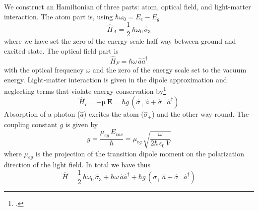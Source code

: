 We construct an Hamiltonian of three parts:  atom, optical field, and light-matter interaction. The atom part is, using $\hbar \omega_0 = E_e - E_g$ 
\begin{equation}
\hat{H}_A = \frac{1}{2} \, \hbar \omega_0 \, \hat{\sigma}_3
\end{equation}
where we have set the zero of the energy scale half way between ground and excited state. The optical field part is
\begin{equation}
\hat{H}_F = \hbar \omega \, \hat{a} \hat{a}^\dagger
\end{equation}
with the optical frequency $\omega$ and the zero of the energy scale set to the vacuum energy. Light-matter interaction is given in the dipole approximation and neglecting terms that violate energy conservation by\footcite[chap. 6.7.1]{Rand2016}
\begin{equation}
\hat{H}_I = - \boldsymbol{\mu} \, \boldsymbol{E} =
 \hbar g \, (\hat{\sigma}_+ \, \hat{a} + \hat{\sigma}_- \,\hat{a}^\dagger )
\end{equation}
Absorption of a photon ($\hat{a}$) excites the atom ($\hat{\sigma}_+$) and the other way round.
The coupling constant $g$ is given by
\begin{equation}
 g = \frac{\mu_{eg} \, E_{vac} }{\hbar}
 =
  \mu_{eg} \, \sqrt{\frac{\omega}{2 \hbar \, \epsilon_0 \, V}}
\end{equation}
where $\mu_{eg} $ is the projection of the transition dipole moment on the polarization direction of the light field. In total we have thus
\begin{equation}
 \hat{H} = \frac{1}{2} \, \hbar \omega_0 \, \hat{\sigma}_3 
 +  \hbar \omega \, \hat{a} \hat{a}^\dagger
 + \hbar g \, (\hat{\sigma}_+ \, \hat{a} + \hat{\sigma}_- \,\hat{a}^\dagger )
\end{equation}

